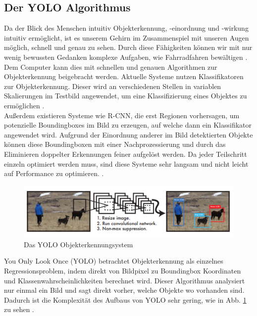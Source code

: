 {{	}
	\subsection{Der YOLO Algorithmus \label{subsec:YOLO_Alg}} 
	{Da der Blick des Menschen intuitiv Objekterkennung, -einordnung und -wirkung intuitiv ermöglicht, ist es unserem Gehirn im Zusammenspiel mit unseren Augen möglich, schnell und genau zu sehen. Durch diese Fähigkeiten können wir mit nur wenig bewussten Gedanken komplexe Aufgaben, wie Fahrradfahren bewältigen \citep{Plastiras2018}. \\
	Dem Computer kann dies mit schnellen und genauen Algorithmen zur Objekterkennung beigebracht werden. Aktuelle Systeme nutzen Klassifikatoren zur Objekterkennung. Dieser wird an verschiedenen Stellen in variablen Skalierungen im Testbild angewendet, um eine Klassifizierung eines Objektes zu ermöglichen \citep{Plastiras2018}. \\ 
	Außerdem existieren Systeme wie R-CNN, die erst Regionen vorhersagen, um potenzielle Boundingboxes im Bild zu erzeugen, auf welche dann ein Klassifikator angewendet wird. Aufgrund der Einordnung anderer im Bild detektierten Objekte können diese Boundingboxen mit einer Nachprozessierung und durch das Eliminieren doppelter Erkennungen feiner aufgelöst werden. Da jeder Teilschritt einzeln optimiert werden muss, sind diese Systeme sehr langsam und nicht leicht auf Performance zu optimieren. \citep{Plastiras2018}. \\
	\begin{figure}[ht]
		\centering
		\includegraphics*[scale = 1, keepaspectratio, trim=2 2 2 2 ]{images/YOLO/YOLO_detection_system.png}
		\caption[Das YOLO Objekterkennungsystem]{Das YOLO Objekterkennungsystem \citep{Plastiras2018}}
		\label{YOLO_Objectdetection}
 	\end{figure}
	\glqq You Only Look Once\grqq{} (YOLO) betrachtet Objekterkennung als einzelnes Regressionsproblem, indem direkt von Bildpixel zu Boundingbox Koordinaten und Klassenwahrscheinlichkeiten berechnet wird. Dieser Algorithmus analysiert nur einmal ein Bild und sagt direkt vorher, welche Objekte wo vorhanden sind. Dadurch ist die Komplexität des  Aufbaus von YOLO sehr gering, wie in Abb. \ref{YOLO_Objectdetection} zu sehen \citep{Plastiras2018}. \\
}}
